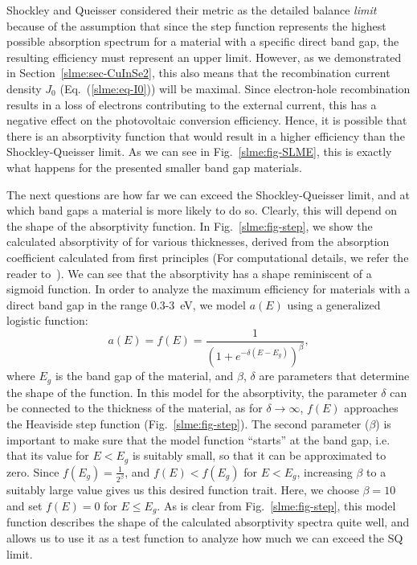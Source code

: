 \begin{refsection}
Shockley and Queisser considered their metric as the detailed balance 
\textit{limit} because of the assumption that since the step function 
represents the highest possible absorption spectrum for a material with a 
specific direct band gap, the resulting efficiency must represent an upper 
limit. However, as we demonstrated in Section~\ref{slme:sec-CuInSe2}, this 
also means that the recombination current density $J_0$ 
(Eq.~(\ref{slme:eq-I0})) will be maximal. Since electron-hole recombination 
results in a loss of electrons contributing to the external current, this has 
a negative effect on the photovoltaic conversion efficiency. Hence, it is 
possible that there is an absorptivity function that would result in a higher 
efficiency than the Shockley-Queisser limit. As we can see in 
Fig.~\ref{slme:fig-SLME}, this is exactly what happens for the presented 
smaller band gap materials. 
 
The next questions are how far we can exceed the Shockley-Queisser limit, and 
at which band gaps a material is more likely to do so. Clearly, this will 
depend on the shape of the absorptivity function. In Fig.~\ref{slme:fig-step}, 
we show the calculated absorptivity of  for various thicknesses, 
derived from the absorption coefficient calculated from first principles (For 
computational details, we refer the reader to~\cite{Sarmadian2016}). We can 
see that the absorptivity has a shape reminiscent of a sigmoid function. In 
order to analyze the maximum efficiency for materials with a direct band gap 
in the range 0.3-3~\si{\electronvolt}, we model $a(E)$ using a generalized 
logistic function: 
\begin{equation} 
a(E) = f(E) = \frac{1}{(1+e^{-\delta (E - E_g)})^{\beta}}, 
\end{equation} 
where $E_g$ is the band gap of the material, and $\beta$, $\delta$ are 
parameters that determine the shape of the function. In this model for the 
absorptivity, the parameter $\delta$ can be connected to the thickness of the 
material, as for $\delta\rightarrow\infty$, $f(E)$ approaches the Heaviside 
step function (Fig.~\ref{slme:fig-step}). The second parameter ($\beta$) is 
important to make sure that the model function ``starts'' at the band gap, 
i.e. that its value for $E < E_g$ is suitably small, so that it can be 
approximated to zero. Since $f(E_g) = \frac{1}{2^\beta}$, and $f(E) < f(E_g)$ 
for $E < E_g$, increasing $\beta$ to a suitably large value gives us this 
desired function trait. Here, we choose $\beta = 10$ and set $f(E) = 0$ for $E 
\leq E_g$. As is clear from Fig.~\ref{slme:fig-step}, this model function 
describes the shape of the calculated absorptivity spectra quite well, and 
allows us to use it as a test function to analyze how much we can exceed the 
SQ limit. 
 

\end{refsection}
